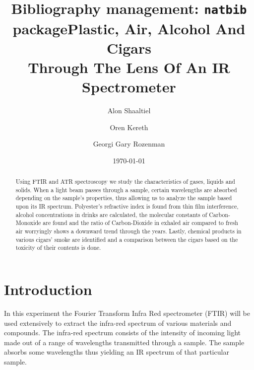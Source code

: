 \documentclass[reprint,amsmath,amssymb,aps, prl,superscriptaddress]{revtex4-2}
\title{Bibliography management: \texttt{natbib} package}
\begin{document}

\title{Plastic, Air, Alcohol And Cigars\\Through The Lens Of An IR Spectrometer}


\author{Alon Shaaltiel}
\author{Oren Kereth}
\author{Georgi Gary Rozenman}



\date{\today}%

\begin{abstract}
Using FTIR and ATR spectroscopy we study the characteristics of gases, liquids and solids. When a light beam passes through a sample, certain wavelengths are absorbed depending on the sample's properties, thus allowing us to analyze the sample based upon its IR spectrum. Polyester's refractive index is found from thin film interference, alcohol concentrations in drinks are calculated, the molecular constants of Carbon-Monoxide are found and the ratio of Carbon-Dioxide in exhaled air compared to fresh air worryingly shows a downward trend through the years. Lastly, chemical products in various cigars' smoke are identified and a comparison between the cigars based on the toxicity of their contents is done.
\end{abstract}

\maketitle
\renewcommand*{\thesection}{\arabic{section}}
\renewcommand*{\thesubsection}{\arabic{section}.\arabic{subsection}}

\section{Introduction}
In this experiment the Fourier Transform Infra Red spectrometer (FTIR) will be used extensively to extract the infra-red spectrum of various materials and compounds. The infra-red spectrum consists of the intensity of incoming light made out of a range of wavelengths transmitted through a sample. The sample absorbs some wavelengths thus yielding an IR spectrum of that particular sample.
\end{document}
